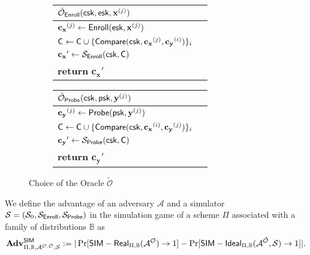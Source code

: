\begin{figure}[h]
	\begin{center}

		\begin{subfigure}[t]{0.49\textwidth}
		\begin{tabular}{l c}
			$\tilde{\mathcal{O}}_{\sf Enroll}({\sf csk}, {\sf esk}, \mathbf{x}^{(j)})$\\

			\hline

			$\mathbf{c_x}^{(j)} \gets {\sf Enroll}({\sf esk}, \mathbf{x}^{(j)})$ \\

			${\sf C} \gets {\sf C} \cup \{ {\sf Compare}({\sf csk}, \mathbf{c_x}^{(j)}, \mathbf{c_y}^{(i)}) \}_{i}$ \\

			$\mathbf{c_x}' \gets \mathcal{S}_{\sf Enroll}({\sf csk}, {\sf C} )$ \\
			
			\textbf{return} $\mathbf{c_x}'$
			
		\end{tabular}
		\end{subfigure}
		\begin{subfigure}[t]{0.49\textwidth}
		\begin{tabular}{l c}
			$\tilde{\mathcal{O}}_{\sf Probe}({\sf csk}, {\sf psk}, \mathbf{y}^{(j)})$\\

			\hline

			$\mathbf{c_y}^{(j)} \gets {\sf Probe}( {\sf psk}, \mathbf{y}^{(j)} ) $ \\

			${\sf C} \gets {\sf C} \cup \{ {\sf Compare}({\sf csk}, \mathbf{c_x}^{(i)}, \mathbf{c_y}^{(j)}) \}_{i}$ \\

			$\mathbf{c_y}' \gets \mathcal{S}_{\sf Probe}({\sf csk}, {\sf C} )$ \\

			\textbf{return} $\mathbf{c_y}'$
			
		\end{tabular}
		\end{subfigure}
	\end{center}
	\caption{Choice of the Oracle $\tilde{\mathcal{O}}$}
	\label{fig:sim_game_oracle}
\end{figure}


We define the advantage of an adversary $\mathcal{A}$ and a simulator $\mathcal{S} = (\mathcal{S}_0, \mathcal{S}_{\sf Enroll}, \mathcal{S}_{\sf Probe})$ in the simulation game of a scheme $\Pi$ associated with a family of distributions $\mathbb{B}$ as
\[
	\mathbf{Adv}^{\sf SIM}_{\Pi, \mathbb{B}, \mathcal{A}^{\mathcal{O}, \tilde{\mathcal{O}}}, \mathcal{S}} := |\Pr[{\sf SIM-Real}_{\Pi, \mathbb{B}}(\mathcal{A}^\mathcal{O}) \to 1] - \Pr[{\sf SIM-Ideal}_{\Pi, \mathbb{B}}(\mathcal{A}^{\tilde{\mathcal{O}}}, \mathcal{S}) \to 1]|.
\]

